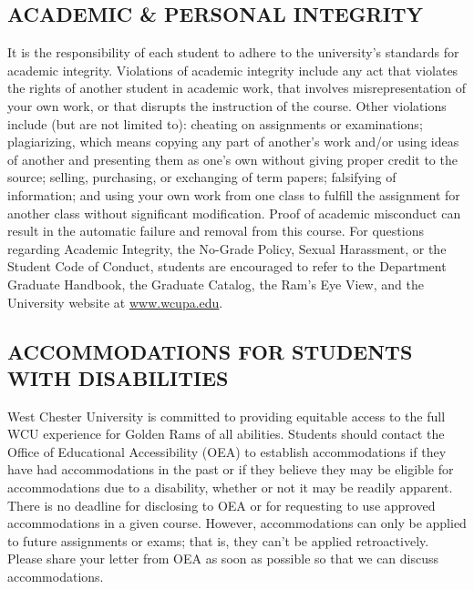 \documentclass[
]{article}
\begin{document}
\hypertarget{academic-personal-integrity}{%
\subsection{ACADEMIC \& PERSONAL
INTEGRITY}\label{academic-personal-integrity}}

It is the responsibility of each student to adhere to the university's
standards for academic integrity. Violations of academic integrity
include any act that violates the rights of another student in academic
work, that involves misrepresentation of your own work, or that disrupts
the instruction of the course. Other violations include (but are not
limited to): cheating on assignments or examinations; plagiarizing,
which means copying any part of another's work and/or using ideas of
another and presenting them as one's own without giving proper credit to
the source; selling, purchasing, or exchanging of term papers;
falsifying of information; and using your own work from one class to
fulfill the assignment for another class without significant
modification. Proof of academic misconduct can result in the automatic
failure and removal from this course. For questions regarding Academic
Integrity, the No-Grade Policy, Sexual Harassment, or the Student Code
of Conduct, students are encouraged to refer to the Department Graduate
Handbook, the Graduate Catalog, the Ram's Eye View, and the University
website at \url{www.wcupa.edu}.

\hypertarget{accommodations-for-students-with-disabilities}{%
\subsection{ACCOMMODATIONS FOR STUDENTS WITH
DISABILITIES}\label{accommodations-for-students-with-disabilities}}

West Chester University is committed to providing equitable access to
the full WCU experience for Golden Rams of all abilities. Students
should contact the Office of Educational Accessibility (OEA) to
establish accommodations if they have had accommodations in the past or
if they believe they may be eligible for accommodations due to a
disability, whether or not it may be readily apparent. There is no
deadline for disclosing to OEA or for requesting to use approved
accommodations in a given course. However, accommodations can only be
applied to future assignments or exams; that is, they can't be applied
retroactively. Please share your letter from OEA as soon as possible so
that we can discuss accommodations.
\end{document}
